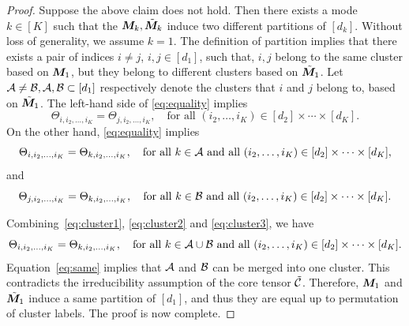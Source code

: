 \documentclass{article}
\begin{document}
\begin{appendices}
\begin{proof}
Suppose the above claim does not hold. Then there exists a mode $k\in[K]$ such that the $\bm M_k, \tilde {\bm M}_k$ induce two different partitions of $[d_k]$. Without loss of generality, we assume $k=1$. The definition of partition implies that there exists a pair of indices $i\neq j$, $i,j\in[d_1]$, such that, $i,j$ belong to the same cluster based on $\bm M_1$, but they belong to different clusters based on $\tilde {\bm M}_1$. Let $\mathcal{A}\neq \mathcal{B}, \mathcal{A}, \mathcal{B} \subset[d_1]$ respectively denote the  clusters that $i$ and $j$ belong to, based on $\tilde {\bm M}_1$. The left-hand side of \eqref{eq:equality} implies
\begin{equation}\label{eq:cluster1}
\Theta_{i,i_2,\ldots,i_K}=\Theta_{j,i_2,\ldots,i_K},\quad \text{for all } (i_2,\ldots,i_K)\in[d_2]\times\cdots\times [d_K].
\end{equation}
 On the other hand, \eqref{eq:equality} implies
\begin{equation}\label{eq:cluster2}
\Theta_{i,i_2,\ldots,i_K}=\Theta_{k,i_2,\ldots,i_K},\quad \text{for all } k\in \mathcal{A} \text{ and all }(i_2,\ldots,i_K)\in[d_2]\times\cdots\times [d_K],
\end{equation}
and
\begin{equation}\label{eq:cluster3}
\Theta_{j,i_2,\ldots,i_K}=\Theta_{k,i_2,\ldots,i_K},\quad \text{for all } k\in \mathcal{B} \text{ and all }(i_2,\ldots,i_K)\in[d_2]\times\cdots\times [d_K].
\end{equation}

Combining~\eqref{eq:cluster1}, \eqref{eq:cluster2} and \eqref{eq:cluster3}, we have
\begin{equation}\label{eq:same}
\Theta_{i,i_2,\ldots,i_K}=\Theta_{k,i_2,\ldots,i_K},\quad \text{for all } k\in \mathcal{A}\cup \mathcal{B} \text{ and all }(i_2,\ldots,i_K)\in[d_2]\times\cdots\times [d_K].
\end{equation}
Equation~\eqref{eq:same} implies that $\mathcal{A}$ and $\mathcal{B}$ can be merged into one cluster. This contradicts the irreducibility assumption of the core tensor $\tilde {\mathcal{C}}$. Therefore, $\bm M_1$ and $\tilde {\bm M}_1$ induce a same partition of $[d_1]$, and thus they are equal up to permutation of cluster labels. The proof is now complete. 
\end{proof}




\end{appendices}
\end{document}
